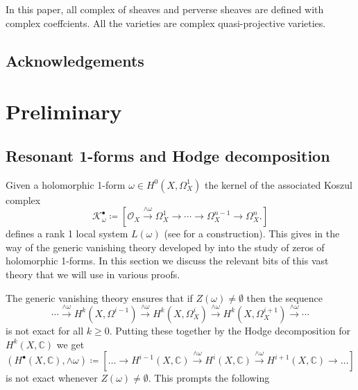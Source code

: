 \documentclass[12pt,reqno]{amsart}
\theoremstyle{question}
\theoremstyle{definition}
\newtheorem{definition}[theorem]{Definition}
\theoremstyle{remark}
\theoremstyle{cited}
\theoremstyle{citeddef}
\newcommand{\C}{\mathbb{C}}
\newcommand{\sK}{\mathcal{K}}
\newcommand{\sO}{\mathcal{O}}
\newcommand{\sZ}{\mathcal{Z}}
\newcommand{\bbC}{\mathbb{C}}
\begin{document}
In this paper, all complex of sheaves and perverse sheaves are defined with complex
coeffcients. All the varieties are complex quasi-projective varieties. 

\subsection*{Acknowledgements}



\section{Preliminary}
\subsection{Resonant 1-forms and Hodge decomposition}
Given a holomorphic 1-form $\omega\in H^0(X,\Omega_X^1)$
the kernel of the associated Koszul complex
\begin{equation}
\sK^{\bullet}_{\omega} \coloneqq [\sO_X\overset{\wedge\omega}{\to} \Omega_X^1 \to \cdots\to \Omega_X^{n-1}\to \Omega^n_X.]
\label{eq:koszul}
\end{equation}
defines a rank 1 local system $L(\omega)$ (see \cite[\S 2.1]{sch}
for a construction). This gives in the way of the generic vanishing theory developed by \cite{GL, Ara, Sim} into the 
study of zeros of holomorphic 1-forms. In this section we discuss 
the relevant bits of this vast theory that we will use in various
proofs.
%
%

 
The generic vanishing theory 
\cite[Proposition 3.4]{GL} ensures that
if $Z(\omega)\neq \emptyset$ then the sequence
\[\cdots\overset{\wedge\omega}{\to} H^k(X, \Omega^{i-1})
\overset{\wedge\omega}{\to}H^k(X, \Omega_X^{i})
\overset{\wedge\omega}{\to} H^k(X,\Omega_X^{i+1})
\overset{\wedge\omega}{\to}\cdots\]
is not exact for all $k\geq 0$. Putting these together 
by the Hodge decomposition for $H^k(X,\bbC)$ we get
\begin{equation}
(H^{\bullet}(X,\bbC), \wedge\omega)\coloneqq [\ldots\to H^{i-1}(X,\C)\overset{\wedge\omega}{\longrightarrow}H^{i}(X,\C)\overset{\wedge\omega}{\longrightarrow}H^{i+1}(X,\C)\to\ldots]
\label{eq:resonance}
\end{equation}
is not exact whenever $Z(\omega)\neq \emptyset$. This prompts the following
\end{document}
